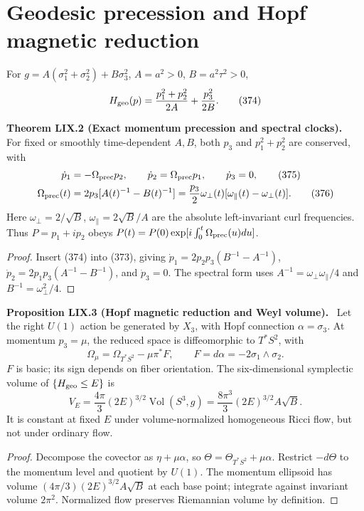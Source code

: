 \documentclass[11pt,a4paper,oneside]{book}
\newcommand{\statement}[3]{\par\medskip\noindent\textbf{#1 #2 (#3).}\ }
\begin{document}
\section{Geodesic precession and Hopf magnetic reduction}
For $g=A(\sigma_1^2+\sigma_2^2)+B\sigma_3^2$, $A=a^2>0$, $B=a^2\tau^2>0$,
\begin{equation}H_{\rm geo}(p)=\frac{p_1^2+p_2^2}{2A}+\frac{p_3^2}{2B}.\tag{374}\end{equation}
\statement{Theorem}{LIX.2}{Exact momentum precession and spectral clocks}
For fixed or smoothly time-dependent $A,B$, both $p_3$ and $p_1^2+p_2^2$ are conserved, with
\begin{align}\dot p_1&=-\Omega_{\rm prec}p_2,\qquad\dot p_2=\Omega_{\rm prec}p_1,\qquad\dot p_3=0,\tag{375}\\
\Omega_{\rm prec}(t)&=2p_3[A(t)^{-1}-B(t)^{-1}]=\frac{p_3}2\omega_\perp(t)[\omega_\parallel(t)-\omega_\perp(t)].\tag{376}\end{align}
Here $\omega_\perp=2/\sqrt B$, $\omega_\parallel=2\sqrt B/A$ are the absolute left-invariant curl frequencies. Thus $P=p_1+ip_2$ obeys $P(t)=P(0)\exp[i\int_0^t\Omega_{\rm prec}(u)du]$.
\begin{proof}
Insert (374) into (373), giving $\dot p_1=2p_2p_3(B^{-1}-A^{-1})$, $\dot p_2=2p_1p_3(A^{-1}-B^{-1})$, and $\dot p_3=0$. The spectral form uses $A^{-1}=\omega_\perp\omega_\parallel/4$ and $B^{-1}=\omega_\perp^2/4$.
\end{proof}
\statement{Proposition}{LIX.3}{Hopf magnetic reduction and Weyl volume}
Let the right $U(1)$ action be generated by $X_3$, with Hopf connection $\alpha=\sigma_3$. At momentum $p_3=\mu$, the reduced space is diffeomorphic to $T^*S^2$, with
\begin{equation}\Omega_\mu=\Omega_{T^*S^2}-\mu\pi^*F,\qquad F=d\alpha=-2\sigma_1\wedge\sigma_2.\tag{377}\end{equation}
$F$ is basic; its sign depends on fiber orientation. The six-dimensional symplectic volume of $\{H_{\rm geo}\le E\}$ is
\begin{equation}V_E=\frac{4\pi}3(2E)^{3/2}\operatorname{Vol}(S^3,g)=\frac{8\pi^3}3(2E)^{3/2}A\sqrt B.\tag{378}\end{equation}
It is constant at fixed $E$ under volume-normalized homogeneous Ricci flow, but not under ordinary flow.
\begin{proof}
Decompose the covector as $\eta+\mu\alpha$, so $\Theta=\Theta_{T^*S^2}+\mu\alpha$. Restrict $-d\Theta$ to the momentum level and quotient by $U(1)$. The momentum ellipsoid has volume $(4\pi/3)(2E)^{3/2}A\sqrt B$ at each base point; integrate against invariant volume $2\pi^2$. Normalized flow preserves Riemannian volume by definition.
\end{proof}
\end{document}
